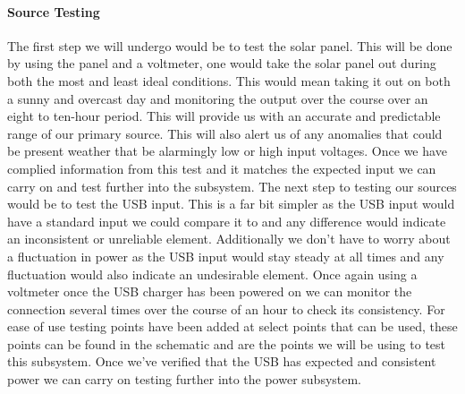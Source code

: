 \paragraph{Source Testing}
The first step we will undergo would be to test the solar panel. This will be done by using the panel and a voltmeter, one would take the solar panel out during both the most and least ideal conditions. This would mean taking it out on both a sunny and overcast day and monitoring the output over the course over an eight to ten-hour period. This will provide us with an accurate and predictable range of our primary source. This will also alert us of any anomalies that could be present weather that be alarmingly low or high input voltages. Once we have complied information from this test and it matches the expected input we can carry on and test further into the subsystem.
The next step to testing our sources would be to test the USB input. This is a far bit simpler as the USB input would have a standard input we could compare it to and any difference would indicate an inconsistent or unreliable element. Additionally we don't have to worry about a fluctuation in power as the USB input would stay steady at all times and any fluctuation would also indicate an undesirable element. Once again using a voltmeter once the USB charger has been powered on we can monitor the connection several times over the course of an hour to check its consistency. For ease of use testing points have been added at select points that can be used, these points can be found in the schematic and are the points we will be using to test this subsystem. Once we've verified that the USB has expected and consistent power we can carry on testing further into the power subsystem.

